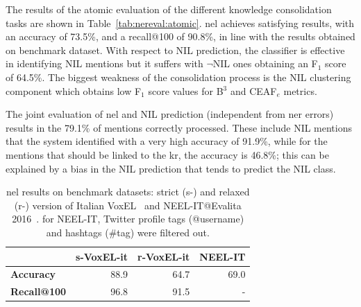 The results of the atomic evaluation of the different knowledge consolidation tasks are shown in Table~\ref{tab:nereval:atomic}. \ac{nel} achieves satisfying results, with an accuracy of 73.5\%, and a recall@100 of 90.8\%, in line with the results obtained on benchmark dataset.
With respect to NIL prediction, the classifier is effective in identifying NIL mentions but it suffers with $\neg$NIL ones obtaining an F$_1$ score of 64.5\%.
The biggest weakness of the consolidation process is the NIL clustering component which obtains low F$_1$ score values for B$^3$ and CEAF$_e$ metrics.

The joint evaluation of \ac{nel} and NIL prediction (independent from \ac{ner} errors) results in the 79.1\% of mentions correctly processed. These include NIL mentions that the system identified with a very high accuracy of 91.9\%, while for the mentions that should be linked to the \ac{kr}, the accuracy is 46.8\%; this can be explained by a bias in the NIL prediction that tends to predict the NIL class. 

\begin{table}[h]
    \centering
    \begin{tabular}{l|rrr}
        \toprule
        & \textbf{s-VoxEL-it} & \textbf{r-VoxEL-it} & \textbf{NEEL-IT} \\
        \midrule
        \textbf{Accuracy}  & 88.9 & 64.7 & 69.0 \\
        \textbf{Recall@100} & 96.8 & 91.5 & - \\
        \bottomrule
    \end{tabular}
    \caption{\ac{nel} results on benchmark datasets: strict (s-) and relaxed (r-) version of Italian VoxEL~\cite{rosales2018voxel} and NEEL-IT@Evalita 2016~\cite{basile2016neelit}. for NEEL-IT, Twitter profile tags (@username) and hashtags (\#tag) were filtered out.}
    \label{tab:nelsota}
\end{table}


